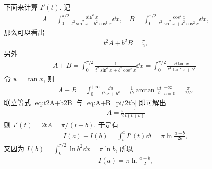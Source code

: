 \begin{exercise}[resume=exer]
\begin{answer}
            下面来计算 $ I'(t) $. 记
            \begin{align*}
                A = \int_{0}^{\pi/2} \frac{\sin^{2}x}{t^{2}\sin^{2}x + b^{2}\cos^{2}x} \dd{x}, \quad B = \int_{0}^{\pi/2} \frac{\cos^{2}x}{t^{2}\sin^{2}x + b^{2}\cos^{2}x} \dd{x},
            \end{align*}
            那么可以看出
            \begin{align}\label{eq:t2A+b2B}
                t^{2}A + b^{2}B = \frac{\pi}{2},
            \end{align}
            另外
            \begin{align*}
                A + B = \int_{0}^{\pi/2} \frac{1}{t^{2}\sin^{2}x + b^{2}\cos^{2}x} \dd{x} = \int_{0}^{\pi/2} \frac{\dd\tan x}{t^{2}\tan^{2}x + b^{2}},
            \end{align*}
            令 $ u = \tan x $, 则
            \begin{align}\label{eq:A+B=pi/2tb}
                A + B = \int_{0}^{+\infty} \frac{\dd u}{t^{2}u^{2} + b^{2}} = \frac{1}{tb}\arctan\frac{ut}{b}\bigg|_{u = 0}^{+\infty } = \frac{\pi}{2tb}.
            \end{align}  
            联立等式 \eqref{eq:t2A+b2B} 与 \eqref{eq:A+B=pi/2tb} 即可解出
            \begin{align*}
                A = \frac{\pi}{2}\frac{1}{t(t + b)}
            \end{align*}
            则 $ I'(t) = 2tA = \pi/(t + b) $. 于是有
            \begin{align*}
                I(a) - I(b) = \int_{b}^{a} I'(t) \dd{t} = \pi\ln\frac{a + b}{2b},
            \end{align*} 
            又因为 $ I(b) = \int_{0}^{\pi/2}\ln b^{2} \dd{x} = \pi\ln b $, 所以
            \begin{align*}
                I(a) = \pi\ln\frac{a + b}{2},
            \end{align*}
            

\end{answer}
\end{exercise}
